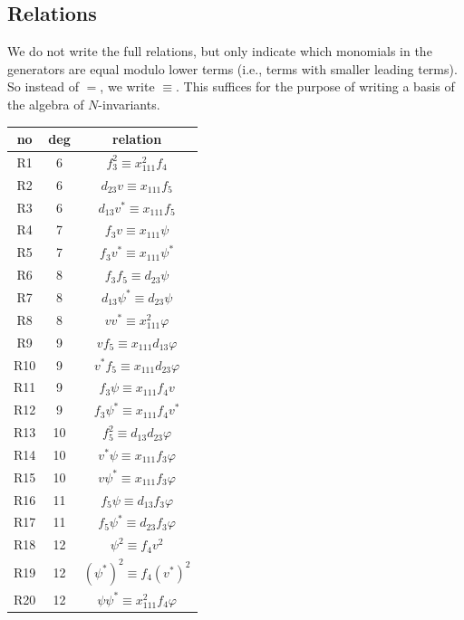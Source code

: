 \documentclass[reqno,11pt]{amsart}
\theoremstyle{remark}
\theoremstyle{definition}
\numberwithin{equation}{section}
\begin{document}
\subsection{Relations}\label{subsec:rels}
We do not write the full relations, but only indicate which monomials in the generators are equal modulo lower terms (i.e., terms with smaller leading terms). So instead of $=$, we write $\equiv$. This suffices for the purpose of writing a basis of the algebra of $N$-invariants.

\bigskip

\begin{center}
	\begin{tabular}{|c|c|c|}
		\hline
		no & deg & relation  \\ \hline\hline
		R1 & 6 & $f_3^2\equiv x_{111}^2f_4$ \\ \hline
		\hline
		R2 & 6 & $d_{23}v\equiv x_{111}f_5$  \\ \hline
		R3 & 6 & $d_{13}v^*\equiv x_{111}f_5$  \\ \hline\hline
		R4 & 7 & $f_3 v\equiv x_{111}\psi$  \\ \hline
		R5 & 7 & $f_3 v^*\equiv x_{111}\psi^*$  \\ \hline\hline
		R6 & 8 & $f_3 f_5\equiv d_{23}\psi$  \\ \hline
		R7 & 8 & $d_{13}\psi^*\equiv d_{23}\psi$  \\ \hline
		R8 & 8 & $vv^*\equiv x_{111}^2\varphi$ \\ \hline\hline
		R9 & 9 & $v f_5\equiv x_{111}d_{13}\varphi$ \\ \hline
		R10 & 9 & $v^* f_5\equiv x_{111}d_{23}\varphi$  \\ \hline
		R11 & 9 & $f_3\psi\equiv x_{111}f_4 v$  \\ \hline
		R12 & 9 & $f_3 \psi^*\equiv x_{111}f_4 v^*$  \\ \hline\hline
		R13 & 10 & $f_5^2 \equiv d_{13}d_{23}\varphi$  \\ \hline
		R14 & 10 & $v^*\psi\equiv x_{111}f_3\varphi$  \\ \hline   
		R15 & 10 & $v\psi^*\equiv x_{111}f_3\varphi$  \\ \hline \hline
		R16 & 11 & $f_5\psi\equiv d_{13}f_3\varphi$  \\ \hline 
		R17 & 11 & $f_5\psi^*\equiv d_{23}f_3\varphi$  \\ \hline \hline
		R18 & 12 & $\psi^2\equiv f_4v^2$  \\ \hline 
		R19 & 12 & $(\psi^*)^2\equiv f_4(v^*)^2$  \\ \hline 
		R20 & 12 & $\psi\psi^*\equiv x_{111}^2f_4\varphi$  \\ \hline 
	\end{tabular}
\end{center}
\end{document}
